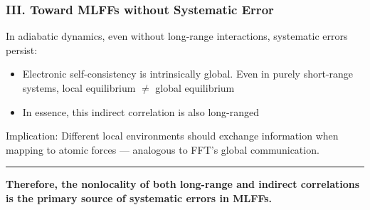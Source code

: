 \documentclass{beamer}
\begin{document}
    \begin{frame}
    	\frametitle{III. Toward MLFFs without Systematic Error} 
    	\footnotesize
    	
    	In adiabatic dynamics, even without long-range interactions, systematic errors persist:
    	
    	\vspace{0.2cm}
    	\begin{itemize}
    		\item Electronic self-consistency is intrinsically global. Even in purely short-range systems, local equilibrium $\neq$ global equilibrium
    		\item In essence, this indirect correlation is also long-ranged
    	\end{itemize}
    	
    	\vspace{0.4cm}
    	Implication: Different local environments should exchange information when mapping to atomic forces — analogous to FFT's global communication.
    	
    	
    	
    	\vspace{0.8cm}
    	\noindent\rule{\textwidth}{0.4pt}
    	\centering
    	\small
    	\textbf{Therefore, the nonlocality of both long-range and indirect correlations is the primary source of systematic errors in MLFFs.}   
    	
    	
    	
    
    	
    \end{frame}
     
     
\end{document}
